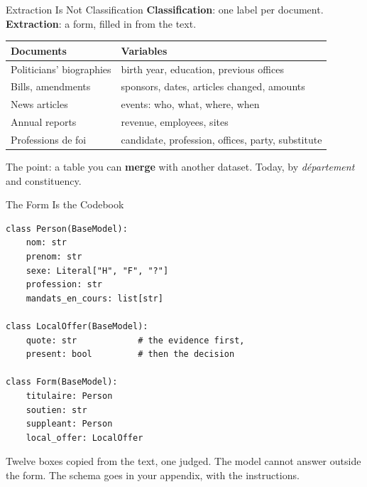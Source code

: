 \documentclass[svgnames,x11names,dvipsnames]{beamer}
\begin{document}
\begin{frame}{Extraction Is Not Classification}
\small
\textbf{Classification}: one label per document. \textbf{Extraction}: a form, filled in from the text.

\vspace{0.4cm}
\renewcommand{\arraystretch}{1.4}
\footnotesize
\begin{tabular}{@{}>{\raggedright\arraybackslash}p{3.4cm}>{\raggedright\arraybackslash}p{6.6cm}@{}}
\toprule
\textbf{Documents} & \textbf{Variables} \\
\midrule
Politicians' biographies & birth year, education, previous offices \\
Bills, amendments & sponsors, dates, articles changed, amounts \\
News articles & events: who, what, where, when \\
Annual reports & revenue, employees, sites \\
Professions de foi & candidate, profession, offices, party, substitute \\
\bottomrule
\end{tabular}

\vspace{0.4cm}
\small
The point: a table you can \textbf{merge} with another dataset. Today, by \textit{d\'epartement} and constituency.
\end{frame}

\begin{frame}[fragile]{The Form Is the Codebook}
\scriptsize
\begin{verbatim}
class Person(BaseModel):
    nom: str
    prenom: str
    sexe: Literal["H", "F", "?"]
    profession: str
    mandats_en_cours: list[str]

class LocalOffer(BaseModel):
    quote: str            # the evidence first,
    present: bool         # then the decision

class Form(BaseModel):
    titulaire: Person
    soutien: str
    suppleant: Person
    local_offer: LocalOffer
\end{verbatim}

\vspace{0.2cm}
\small
Twelve boxes copied from the text, one judged. The model cannot answer outside the form. The schema goes in your appendix, with the instructions.
\end{frame}
\end{document}
